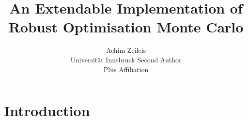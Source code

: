 \documentclass[article]{jss}
\author{Achim Zeileis\\Universit\"at Innsbruck
   \And Second Author\\Plus Affiliation}
\title{An Extendable \proglang{Python} Implementation of Robust Optimisation Monte Carlo}
\begin{document}



\section{Introduction} \label{sec:intro}



\end{document}
